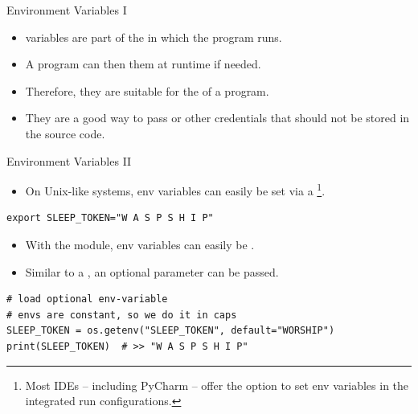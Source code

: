 \documentclass[12pt, aspectratio=169, usepdftitle=false]{beamer}
\newcommand{\pp}[1]{\lpl{#1}}
\begin{document}
\begin{frame}[fragile]{Environment Variables I}
	\begin{itemize}
		\item {} variables are part of the  in which the program runs.
		\pause
		\item A program can then  them at runtime if needed.
		\pause
		\item Therefore, they are suitable for the  of a program.
		\pause
		\item They are a good way to pass  or other credentials that should not be stored in the source code.
	\end{itemize}
\end{frame}


\begin{frame}[fragile]{Environment Variables II}
	\begin{itemize}
	\item On Unix-like systems, env variables can easily be set via a \footnote{Most IDEs – including PyCharm – offer the option to set env variables in the integrated run configurations.}.
	\pause
	\end{itemize}
	\begin{lstlisting}[language=pytiny]
export SLEEP_TOKEN="W A S P S H I P" 
	\end{lstlisting}
	
	\pause
	
	\begin{itemize}
		\item With the \pp{os} module, env variables can easily be .
		\item Similar to a \pp{dict}, an optional  parameter can be passed.
	\end{itemize}
	
	\pause
	
	\begin{lstlisting}[language=pytiny]
# load optional env-variable
# envs are constant, so we do it in caps
SLEEP_TOKEN = os.getenv("SLEEP_TOKEN", default="WORSHIP")
print(SLEEP_TOKEN)  # >> "W A S P S H I P" 
	\end{lstlisting}
	
\end{frame}
\end{document}
